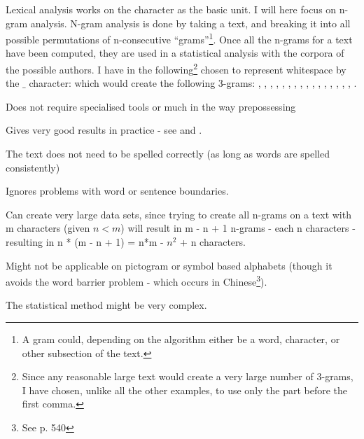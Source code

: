{\label{character}
Lexical analysis works on the character as the basic unit. I will here focus on n-gram analysis. N-gram analysis is done by taking a text, and breaking it into all possible permutations of n-consecutive ``grams''\footnote{A gram could, depending on the algorithm either be a word, character, or other subsection of the text.}. Once all the n-grams for a text have been computed, they are used in a statistical analysis with the corpora of the possible authors. 
}
{
I have in the following\footnote{Since any reasonable large text would create a very large number of 3-grams, I have chosen, unlike all the other examples, to use only the part before the first comma.} chosen to represent whitespace by the $\_$ character:
which would create the following 3-grams: , , , , , , , , , , , , , , , , . 
}
{
\item Does not require specialised tools or much in the way prepossessing
\item Gives very good results in practice - see \cite{nr4} and \cite{nr3}.
\item The text does not need to be spelled correctly (as long as words are spelled consistently)
\item Ignores problems with word or sentence boundaries.
}
{
\item Can create very large data sets, since trying to create all n-grams on a text with m characters (given $n < m$) will result in m - n + 1 n-grams - each n characters - resulting in n * (m - n + 1) = n*m - $n^2$ + n characters.
\item Might not be applicable on pictogram or symbol based alphabets (though it avoids the word barrier problem - which occurs in Chinese\footnote{See \cite{nr1} p. 540}).
\item The statistical method might be very complex.
}

